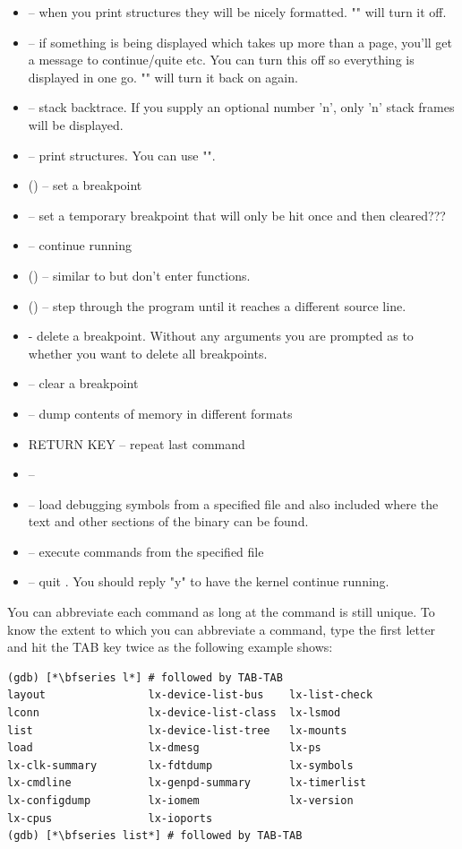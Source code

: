 \begin{itemize}
	\item {}  -- when you print structures they will be nicely formatted. "" will turn it off.
	\item {} -- if something is being displayed which takes up more than a page, you'll get
		a message to continue/quite etc. You can turn this off so everything is displayed in one go. "" will
		turn it back on again.
	\item {} -- stack backtrace. If you supply an optional number 'n', only 'n' stack frames will be displayed.
	\item {} -- print structures.  You can use "". 
	\item {} () -- set a breakpoint
	\item {} -- set a temporary breakpoint that will only be hit once and then cleared???
	\item {} -- continue running
	\item {} () -- similar to  but don't enter functions.
	\item {} () -- step through the program until it reaches a different source line.
	\item {} - delete a breakpoint. Without any arguments you are prompted as to whether you want to delete all breakpoints.
	\item {} -- clear a breakpoint
	\item {} -- dump contents of memory in different formats
	\item RETURN KEY -- repeat last command
	\item {} -- 
	\item {} -- load debugging symbols from a specified file and also included where the text and other sections
		of the binary can be found.
	\item {} -- execute commands from the specified file
	\item {} -- quit . You should reply "y" to have the kernel continue running.
\end{itemize}

\noindent
You can abbreviate each command as long at the command is still unique.  To know the extent to which you can abbreviate a command, type the first letter and hit the TAB key twice as the following example shows:

\begin{lstlisting}
(gdb) [*\bfseries l*] # followed by TAB-TAB
layout                lx-device-list-bus    lx-list-check
lconn                 lx-device-list-class  lx-lsmod
list                  lx-device-list-tree   lx-mounts
load                  lx-dmesg              lx-ps
lx-clk-summary        lx-fdtdump            lx-symbols
lx-cmdline            lx-genpd-summary      lx-timerlist
lx-configdump         lx-iomem              lx-version
lx-cpus               lx-ioports            
(gdb) [*\bfseries list*] # followed by TAB-TAB
\end{lstlisting}

